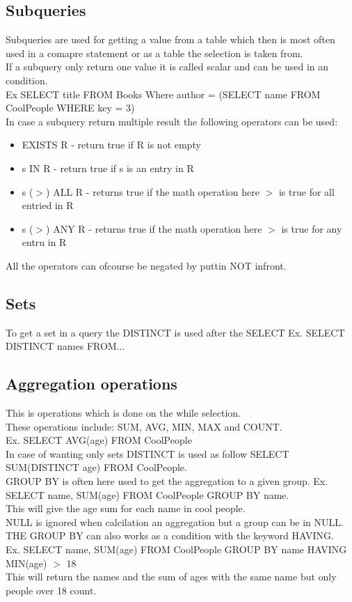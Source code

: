 \documentclass[12pt, a4paper]{article}
\begin{document}
		 \subsection{Subqueries}
		 	Subqueries are used for getting a value from a table which then is most often used in a comapre statement or as a table the selection is taken from.\\
		 	If a subquery only return one value it is called scalar and can be used in an condition.\\
		 	Ex SELECT title FROM Books Where author = (SELECT name FROM CoolPeople WHERE key = 3)\\
		 	In case a subquery return multiple result the following operators can be used:
		 	\begin{itemize}
		 		\item EXISTS R - return true if R is not empty
		 		\item s IN R - return true if s is an entry in R
		 		\item s ($>$) ALL R - returns true if the math operation here $>$ is true for all entried in R
		 		\item s ($>$) ANY R - returns true if the math operation here $>$ is true for any entru in R
			\end{itemize}
			All the operators can ofcourse be negated by puttin NOT infront.
		\subsection{Sets}
			To get a set in a query the DISTINCT is used after the SELECT Ex. SELECT DISTINCT names FROM...\\
		\subsection{Aggregation operations}
			This is operations which is done on the while selection.\\
			These operations include: SUM, AVG, MIN, MAX and COUNT.\\
			Ex. SELECT AVG(age) FROM CoolPeople\\
			In case of wanting only sets DISTINCT is used as follow SELECT SUM(DISTINCT age) FROM CoolPeople.\\
			GROUP BY is often here used to get the aggregation to a given group.
			Ex. SELECT name, SUM(age) FROM CoolPeople GROUP BY name.\\
			This will give the age sum for each name in cool people.\\
			NULL is ignored when calcilation an aggregation but a group can be in NULL.\\
			THE GROUP BY can also works as a condition with the keyword HAVING.\\
			Ex. SELECT name, SUM(age) FROM CoolPeople GROUP BY name HAVING MIN(age) $>$ 18\\
			This will return the names and the sum of ages with the same name but only people over 18 count.
			
		
\end{document}
